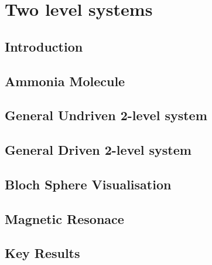 \chapter{Two level systems}
\label{chapt9}

\section{Introduction}

\section{Ammonia Molecule}

\section{General Undriven 2-level system}

\section{General Driven 2-level system}

\section{Bloch Sphere Visualisation}

\section{Magnetic Resonace}

\section{Key Results}
